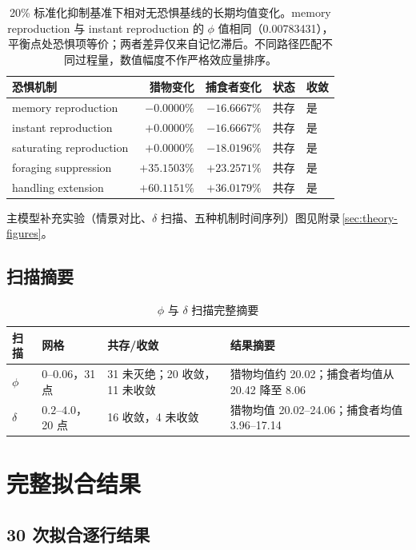 \documentclass[12pt,a4paper]{ctexart}
\begin{document}
\begin{table}[H]
 \centering
 \caption{20\% 标准化抑制基准下相对无恐惧基线的长期均值变化。memory reproduction 与 instant reproduction 的 $\phi$ 值相同（0.00783431），平衡点处恐惧项等价；两者差异仅来自记忆滞后。不同路径匹配不同过程量，数值幅度不作严格效应量排序。}
 \label{tab:mechanism-full}
 \begin{tabular}{lrrll}
  \toprule
  恐惧机制 & 猎物变化 & 捕食者变化 & 状态 & 收敛\\
  \midrule
  memory reproduction & $-0.0000\%$ & $-16.6667\%$ & 共存 & 是\\
  instant reproduction & $+0.0000\%$ & $-16.6667\%$ & 共存 & 是\\
  saturating reproduction & $+0.0000\%$ & $-18.0196\%$ & 共存 & 是\\
  foraging suppression & $+35.1503\%$ & $+23.2571\%$ & 共存 & 是\\
  handling extension & $+60.1151\%$ & $+36.0179\%$ & 共存 & 是\\
  \bottomrule
 \end{tabular}
\end{table}

主模型补充实验（情景对比、$\delta$ 扫描、五种机制时间序列）图见附录\,\ref{sec:theory-figures}。

\subsection{扫描摘要}

\begin{table}[H]
 \centering
 \caption{$\phi$ 与 $\delta$ 扫描完整摘要}
 \begin{tabular}{p{}p{}p{}p{}}
  \toprule
  扫描 & 网格 & 共存/收敛 & 结果摘要\\
  \midrule
  $\phi$ & $0$--$0.06$，31 点 & 31 未灭绝；20 收敛，11 未收敛 & 猎物均值约 20.02；捕食者均值从 20.42 降至 8.06\\
  $\delta$ & $0.2$--$4.0$，20 点 & 16 收敛，4 未收敛 & 猎物均值 20.02--24.06；捕食者均值 3.96--17.14\\
  \bottomrule
 \end{tabular}
\end{table}

\section{完整拟合结果}

\subsection{30 次拟合逐行结果}
\end{document}

